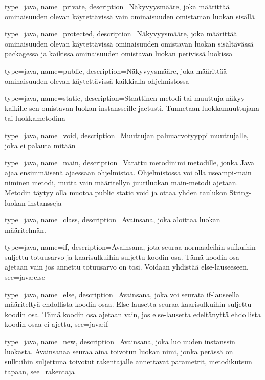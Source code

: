 {
	type=java,
	name=private,
	description={Näkyvyysmääre, joka määrittää ominaisuuden olevan käytettävissä vain ominaisuuden
omistaman luokan sisällä}
}

{
	type=java,
	name=protected,
	description={Näkyvyysmääre, joka määrittää ominaisuuden olevan käytettävissä ominaisuuden
omistavan luokan sisältävässä packagessa ja kaikissa ominaisuuden omistavan luokan perivissä
luokissa}
}

{
	type=java,
	name=public,
	description={Näkyvyysmääre, joka määrittää ominaisuuden olevan käytettävissä kaikkialla
ohjelmistossa}
}

{
	type=java,
	name=static,
	description={Staattinen metodi tai muuttuja näkyy kaikille sen omistavan luokan instansseille
jaetusti. Tunnetaan luokkamuuttujana tai luokkametodina}
}

{
	type=java,
	name=void,
	description={Muuttujan paluuarvotyyppi muuttujalle, joka ei palauta mitään}
}

{
	type=java,
	name=main,
	description={Varattu metodinimi metodille, jonka Java ajaa ensimmäisenä ajaessaan ohjelmistoa.
Ohjelmistossa voi olla useampi-main niminen metodi, mutta vain määritellyn juuriluokan main-metodi
ajetaan. Metodin täytyy olla muotoa public static void ja ottaa yhden taulukon String-luokan
instansseja}
}

{
	type=java,
	name=class,
	description={Avainsana, joka aloittaa luokan määritelmän.}
}

{
	type=java,
	name=if,
	description={Avainsana, jota seuraa normaaleihin sulkuihin suljettu totuusarvo ja
kaarisulkuihin suljettu koodin osa. Tämä koodin osa ajetaan vain jos annettu totuusarvo on
tosi. Voidaan yhdistää else-lauseeseen},
	see=java:else
}

{
	type=java,
	name=else,
	description={Avainsana, joka voi seurata if-lauseella määriteltyä ehdollista koodin osaa.
Else-lausetta seuraa kaarisulkuihin suljettu koodin osa. Tämä koodin osa ajetaan vain, jos
else-lausetta edeltänyttä ehdollista koodin osaa ei ajettu},
	see=java:if
}

{
	type=java,
	name=new,
	description={Avainsana, joka luo uuden instanssin luokasta. Avainsanaa seuraa aina toivotun
luokan nimi, jonka perässä on sulkuihin suljettuna toivotut rakentajalle annettavat parametrit,
metodikutsun tapaan},
	see=rakentaja
}


